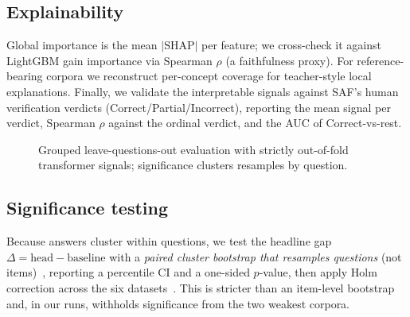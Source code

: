 \documentclass[10pt,twocolumn]{article}
\begin{document}
\subsection{Explainability}
Global importance is the mean $|\text{SHAP}|$ per feature; we cross-check it
against LightGBM gain importance via Spearman $\rho$ (a faithfulness proxy). For
reference-bearing corpora we reconstruct per-concept coverage for teacher-style
local explanations. Finally, we validate the interpretable signals against SAF's
human verification verdicts (Correct/Partial/Incorrect), reporting the mean signal
per verdict, Spearman $\rho$ against the ordinal verdict, and the AUC of
Correct-vs-rest.

\begin{figure}[t]
\centering
{}
\caption{Grouped leave-questions-out evaluation with strictly out-of-fold
transformer signals; significance clusters resamples by question.}
\label{alg:eval}
\end{figure}

\subsection{Significance testing}
Because answers cluster within questions, we test the headline gap
$\Delta=\text{head}-\text{baseline}$ with a \emph{paired cluster bootstrap that
resamples questions} (not items)~\cite{efron1993bootstrap}, reporting a percentile
CI and a one-sided $p$-value, then apply Holm correction across the six
datasets~\cite{holm1979simple}. This is stricter than an item-level bootstrap and,
in our runs, withholds significance from the two weakest corpora.
\end{document}
